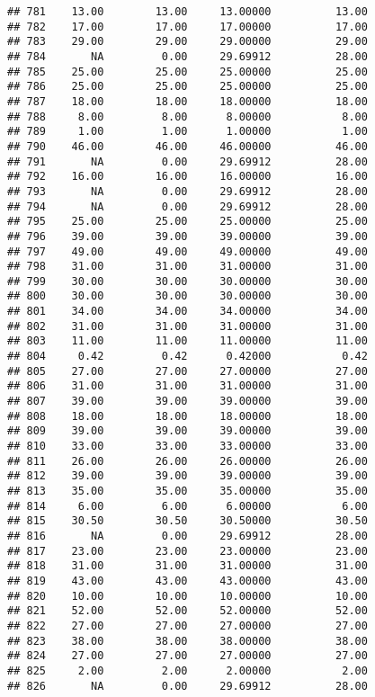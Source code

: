 \documentclass[
]{article}
\begin{document}
\begin{verbatim}
## 781    13.00        13.00     13.00000          13.00
## 782    17.00        17.00     17.00000          17.00
## 783    29.00        29.00     29.00000          29.00
## 784       NA         0.00     29.69912          28.00
## 785    25.00        25.00     25.00000          25.00
## 786    25.00        25.00     25.00000          25.00
## 787    18.00        18.00     18.00000          18.00
## 788     8.00         8.00      8.00000           8.00
## 789     1.00         1.00      1.00000           1.00
## 790    46.00        46.00     46.00000          46.00
## 791       NA         0.00     29.69912          28.00
## 792    16.00        16.00     16.00000          16.00
## 793       NA         0.00     29.69912          28.00
## 794       NA         0.00     29.69912          28.00
## 795    25.00        25.00     25.00000          25.00
## 796    39.00        39.00     39.00000          39.00
## 797    49.00        49.00     49.00000          49.00
## 798    31.00        31.00     31.00000          31.00
## 799    30.00        30.00     30.00000          30.00
## 800    30.00        30.00     30.00000          30.00
## 801    34.00        34.00     34.00000          34.00
## 802    31.00        31.00     31.00000          31.00
## 803    11.00        11.00     11.00000          11.00
## 804     0.42         0.42      0.42000           0.42
## 805    27.00        27.00     27.00000          27.00
## 806    31.00        31.00     31.00000          31.00
## 807    39.00        39.00     39.00000          39.00
## 808    18.00        18.00     18.00000          18.00
## 809    39.00        39.00     39.00000          39.00
## 810    33.00        33.00     33.00000          33.00
## 811    26.00        26.00     26.00000          26.00
## 812    39.00        39.00     39.00000          39.00
## 813    35.00        35.00     35.00000          35.00
## 814     6.00         6.00      6.00000           6.00
## 815    30.50        30.50     30.50000          30.50
## 816       NA         0.00     29.69912          28.00
## 817    23.00        23.00     23.00000          23.00
## 818    31.00        31.00     31.00000          31.00
## 819    43.00        43.00     43.00000          43.00
## 820    10.00        10.00     10.00000          10.00
## 821    52.00        52.00     52.00000          52.00
## 822    27.00        27.00     27.00000          27.00
## 823    38.00        38.00     38.00000          38.00
## 824    27.00        27.00     27.00000          27.00
## 825     2.00         2.00      2.00000           2.00
## 826       NA         0.00     29.69912          28.00

\end{verbatim}
\end{document}
